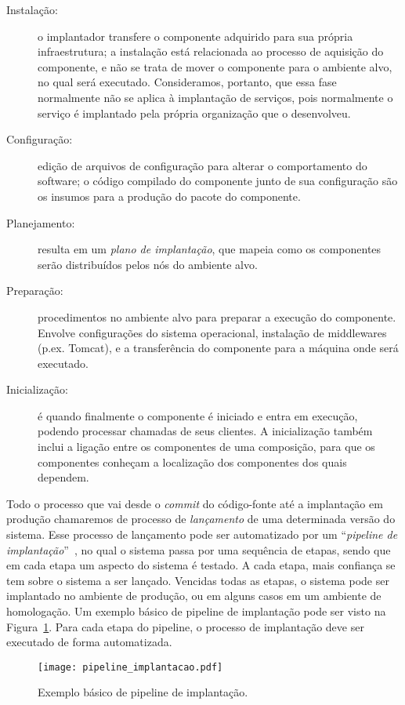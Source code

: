 \begin{description}
\item [Instalação:] o implantador transfere o componente adquirido para sua própria infraestrutura; a instalação está relacionada ao processo de aquisição do componente, e não se trata de mover o componente para o ambiente alvo, no qual será executado. Consideramos, portanto, que essa fase normalmente não se aplica à implantação de serviços, pois normalmente o serviço é implantado pela própria organização que o desenvolveu.
\item [Configuração:] edição de arquivos de configuração para alterar o comportamento do software; 
o código compilado do componente junto de sua configuração são os insumos para a produção do pacote do componente.
\item [Planejamento:] resulta em um \emph{plano de implantação}, que mapeia como os componentes serão distribuídos pelos nós do ambiente alvo.  
\item [Preparação:] procedimentos no ambiente alvo para preparar a execução do componente. Envolve configurações do sistema operacional, instalação de middlewares (p.ex. Tomcat), e a transferência do componente para a máquina onde será executado. 
\item [Inicialização:] é quando finalmente o componente é iniciado e entra em execução, podendo processar chamadas de seus clientes. A inicialização também inclui a ligação entre os componentes de uma composição, para que os componentes conheçam a localização dos componentes dos quais dependem.
\end{description}

Todo o processo que vai desde o \emph{commit} do código-fonte até a implantação em produção
chamaremos de processo de \emph{lançamento} de uma determinada versão do sistema.
Esse processo de lançamento pode ser automatizado por um 
``\emph{pipeline de implantação}''~\cite{Humble2011Continuous},
no qual o sistema passa por uma sequência de etapas,
sendo que em cada etapa um aspecto do sistema é testado.
A cada etapa, mais confiança se tem sobre o sistema a ser lançado.
Vencidas todas as etapas, o sistema pode ser implantado no ambiente de produção,
ou em alguns casos em um ambiente de homologação.
Um exemplo básico de pipeline de implantação pode ser visto na Figura~\ref{fig:pipeline_implantacao}.
Para cada etapa do pipeline, o processo de implantação 
deve ser executado de forma automatizada.

\begin{figure}[!h]
  \centering
  \texttt{[image: pipeline\_implantacao.pdf]} 
  \caption{Exemplo básico de pipeline de implantação.}
  \label{fig:pipeline_implantacao} 
\end{figure}

